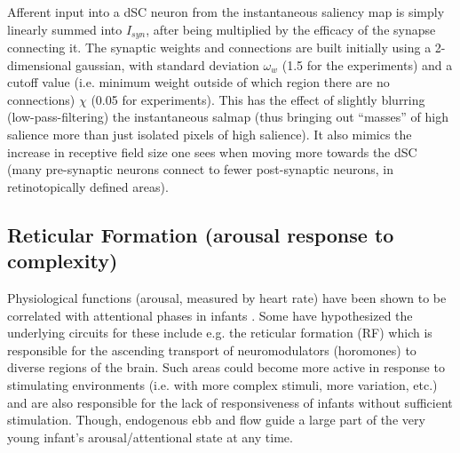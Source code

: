 \documentclass[conference]{IEEEtran}
\begin{document}
Afferent input into a dSC neuron from the instantaneous saliency map
is simply linearly summed into $I_{syn}$, after being multiplied by
the efficacy of the synapse connecting it. The synaptic weights and
connections are built initially using a 2-dimensional gaussian, with
standard deviation $\omega_w$ (1.5 for the experiments) and a cutoff
value (i.e. minimum weight outside of which region there are no
connections) $\chi$ (0.05 for experiments). This has the effect of
slightly blurring (low-pass-filtering) the instantaneous salmap (thus
bringing out ``masses'' of high salience more than just isolated
pixels of high salience). It also mimics the increase in receptive
field size one sees when moving more towards the dSC (many
pre-synaptic neurons connect to fewer post-synaptic neurons, in
retinotopically defined areas).


\subsection{Reticular Formation (arousal response to complexity)}

Physiological functions (arousal, measured by heart rate) have been
shown to be correlated with attentional phases in infants
\cite{richards_casey_1990}. Some have hypothesized the underlying
circuits for these include e.g. the reticular formation (RF) which is
responsible for the ascending transport of neuromodulators (horomones)
to diverse regions of the brain. Such areas could become more active
in response to stimulating environments (i.e. with more complex
stimuli, more variation, etc.) and are also responsible for the lack
of responsiveness of infants without sufficient stimulation. Though,
endogenous ebb and flow guide a large part of the very young infant's
arousal/attentional state at any time.
\end{document}
